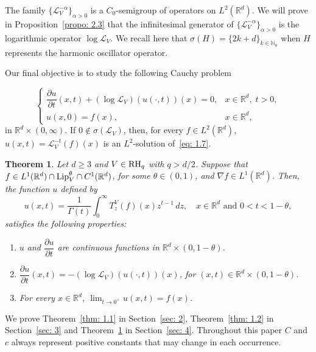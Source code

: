 \documentclass[10pt, a4paper, reqno]{amsart}
\newtheorem{thm}{Theorem}[section]
\theoremstyle{definition}
\theoremstyle{remark}
\newcommand{\RH}{\textup{RH}}
\newcommand{\Lip}{\textup{Lip}}
\numberwithin{equation}{section}
\begin{document}
The family $\{\mathcal{L}_V^{-\alpha}\}_{\alpha>0}$ is a $C_0$-semigroup of operators on $L^2(\mathbb{R}^d)$. We will prove in Proposition~\ref{propo: 2.3} that the infinitesimal generator of $\{\mathcal{L}_V^{-\alpha}\}_{\alpha>0}$ is the logarithmic operator $\log \mathcal{L}_V$. We recall here that $\sigma(H) = \{2k+d\}_{k\in \mathbb{N}_0}$ when $H$ represents the harmonic oscillator operator.

Our final objective is to study the following Cauchy problem

\begin{equation}\label{eq: 1.7}
    \begin{cases}
        \dfrac{\partial u}{\partial t} (x,t) + (\log \mathcal{L}_V) (u(\cdot,t))(x) = 0, & x \in \mathbb{R}^d, \; t > 0,\\
        u(x,0) = f(x), & x \in \mathbb{R}^d,
    \end{cases}
\end{equation}
in $\mathbb{R}^d \times (0,\infty)$. If $0 \notin \sigma(\mathcal{L}_V)$, then, for every $f \in L^2(\mathbb{R}^d)$, $u(x,t) = \mathcal{L}_V^{-t} (f)(x)$ is an $L^2$-solution of~\eqref{eq: 1.7}.

\begin{thm}\label{thm: 1.3}
    Let $d \geq 3$ and $V \in \RH_q$ with $q > d/2$. Suppose that $f \in L^1(\mathbb{R}^d) \cap \Lip_V^\theta \cap C^1(\mathbb{R}^d)$, for some $\theta \in (0,1)$, and $\nabla f \in L^1(\mathbb{R}^d)$. Then, the function $u$ defined by
    \begin{equation*}
        u(x,t) = \frac{1}{\Gamma(t)} \int_0^\infty T_z^V (f)(x) z^{t-1} \, dz, \quad x \in \mathbb{R}^d \text{ and } 0 < t < 1 - \theta,
    \end{equation*}
    satisfies the following properties:
    \begin{enumerate}
        \item $u$ and $\dfrac{\partial u}{\partial t}$ are continuous functions in $\mathbb{R}^d \times (0,1-\theta)$. 
        \item $\dfrac{\partial u}{\partial t}(x,t) = -(\log \mathcal{L}_V)(u(\cdot,t))(x)$, for $(x,t) \in \mathbb{R}^d \times (0,1-\theta)$.  
        \item For every $x \in \mathbb{R}^d$, $\displaystyle \lim_{t\rightarrow 0^+} u(x,t) = f(x)$.
    \end{enumerate}
\end{thm}

We prove Theorem~\ref{thm: 1.1} in Section~\ref{sec: 2}, Theorem~\ref{thm: 1.2} in Section~\ref{sec: 3} and Theorem~\ref{thm: 1.3} in Section~\ref{sec: 4}. Throughout this paper $C$ and $c$ always represent positive constants that may change in each occurrence.
\end{document}
